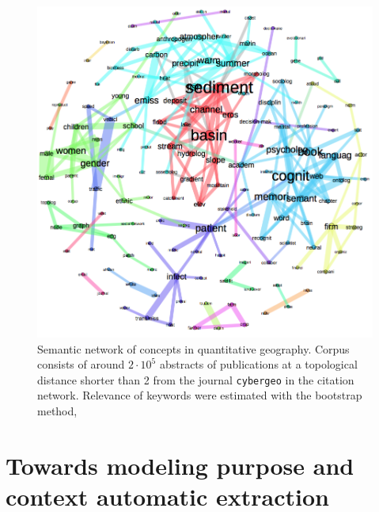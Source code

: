 \begin{figure}
\hspace{-4cm}
\includegraphics[width=1.4\textwidth]{Figures/PartI/QuantitativeEpistemo/HyperNetwork/all_lesslinks}
\caption[Semantic network of concepts in quantitative geography]{Semantic network of concepts in quantitative geography. Corpus consists of around $2\cdot 10^5$ abstracts of publications at a topological distance shorter than 2 from the journal \texttt{cybergeo} in the citation network. Relevance of keywords were estimated with the bootstrap method, }
\end{figure}








\newpage



\section{Towards modeling purpose and context automatic extraction}






